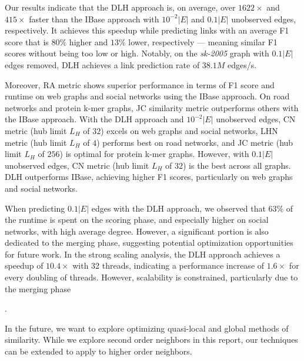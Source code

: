 Our results indicate that the DLH approach is, on average, over $1622\times$ and $415\times$ faster than the IBase approach with $10^{-2}|E|$ and $0.1|E|$ unobserved edges, respectively. It achieves this speedup while predicting links with an average F1 score that is $80\%$ higher and $13\%$ lower, respectively --- meaning similar F1 scores without being too low or high. Notably, on the \textit{sk-2005} graph with $0.1|E|$ edges removed, DLH achieves a link prediction rate of $38.1M$ edges/s.

Moreover, RA metric shows superior performance in terms of F1 score and runtime on web graphs and social networks using the IBase approach. On road networks and protein k-mer graphs, JC similarity metric outperforms others with the IBase approach. With the DLH approach and $10^{-2}|E|$ unobserved edges, CN metric (hub limit $L_H$ of $32$) excels on web graphs and social networks, LHN metric (hub limit $L_H$ of $4$) performs best on road networks, and JC metric (hub limit $L_H$ of $256$) is optimal for protein k-mer graphs. However, with $0.1|E|$ unobserved edges, CN metric (hub limit $L_H$ of $32$) is the best across all graphs. DLH outperforms IBase, achieving higher F1 scores, particularly on web graphs and social networks.

When predicting $0.1|E|$ edges with the DLH approach, we observed that $63\%$ of the runtime is spent on the scoring phase, and especially higher on social networks, with high average degree. However, a significant portion is also dedicated to the merging phase, suggesting potential optimization opportunities for future work. In the strong scaling analysis, the DLH approach achieves a speedup of $10.4\times$ with 32 threads, indicating a performance increase of $1.6\times$ for every doubling of threads. However, scalability is constrained, particularly due to the merging phase.

In the future, we want to explore optimizing quasi-local and global methods of similarity. While we explore second order neighbors in this report, our techniques can be extended to apply to higher order neighbors.

